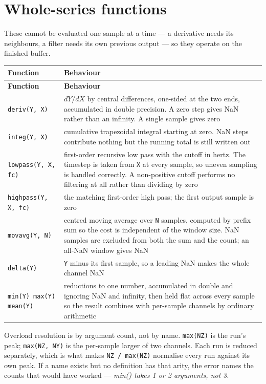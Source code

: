 \documentclass[11pt,a4paper,oneside]{report}
\newcommand{\code}[1]{\texttt{#1}}
\begin{document}
\section{Whole-series functions}

These cannot be evaluated one sample at a time --- a derivative needs its
neighbours, a filter needs its own previous output --- so they operate on the
finished buffer.

\begin{center}
\small
\begin{longtable}{@{}p{}p{}@{}}
\toprule
\textbf{Function} & \textbf{Behaviour} \\
\midrule
\endfirsthead
\toprule
\textbf{Function} & \textbf{Behaviour} \\
\midrule
\endhead
\code{deriv(Y, X)} & $dY/dX$ by central differences, one-sided at the two ends, accumulated in double precision. A zero step gives NaN rather than an infinity. A single sample gives zero \\
\code{integ(Y, X)} & cumulative trapezoidal integral starting at zero. NaN steps contribute nothing but the running total is still written out \\
\code{lowpass(Y, X, fc)} & first-order recursive low pass with the cutoff in hertz. The timestep is taken from \code{X} at every sample, so uneven sampling is handled correctly. A non-positive cutoff performs no filtering at all rather than dividing by zero \\
\code{highpass(Y, X, fc)} & the matching first-order high pass; the first output sample is zero \\
\code{movavg(Y, N)} & centred moving average over \code{N} samples, computed by prefix sum so the cost is independent of the window size. NaN samples are excluded from both the sum and the count; an all-NaN window gives NaN \\
\code{delta(Y)} & \code{Y} minus its first sample, so a leading NaN makes the whole channel NaN \\
\code{min(Y) max(Y) mean(Y)} & reductions to one number, accumulated in double and ignoring NaN and infinity, then held flat across every sample so the result combines with per-sample channels by ordinary arithmetic \\
\bottomrule
\end{longtable}
\end{center}

Overload resolution is by argument count, not by name. \code{max(NZ)} is the
run's peak; \code{max(NZ, NY)} is the per-sample larger of two channels. Each run
is reduced separately, which is what makes \code{NZ / max(NZ)} normalise every
run against its own peak. If a name exists but no definition has that arity, the
error names the counts that would have worked --- \emph{min() takes 1 or 2
arguments, not 3}.
\end{document}
